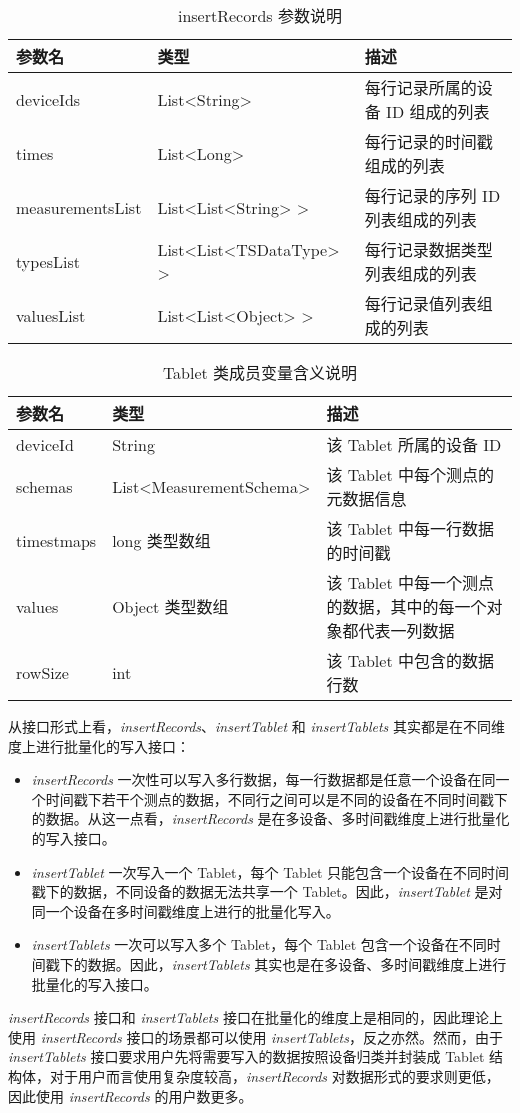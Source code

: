 \begin{table}
  \centering
  \caption{insertRecords 参数说明}
  \begin{tabular}{lll}
    \toprule
    参数名 &  类型 & 描述 \\
    \midrule
    deviceIds & List<String> & 每行记录所属的设备 ID 组成的列表 \\
     times & List<Long> & 每行记录的时间戳组成的列表 \\
    measurementsList & List<List<String> > & 每行记录的序列 ID 列表组成的列表 \\
    typesList & List<List<TSDataType> > & 每行记录数据类型列表组成的列表 \\
    valuesList & List<List<Object> > & 每行记录值列表组成的列表 \\
    \bottomrule
  \end{tabular}
  \label{tabular:insert-records-params}
\end{table}

\begin{table}
  \centering
  \caption{Tablet 类成员变量含义说明}
  \begin{tabular}{llp{6cm}}
    \toprule
    参数名 &  类型 & 描述 \\
    \midrule
    deviceId & String & 该 Tablet 所属的设备 ID \\
    schemas & List<MeasurementSchema> & 该 Tablet 中每个测点的元数据信息 \\
    timestmaps & long 类型数组 & 该 Tablet 中每一行数据的时间戳 \\
    values & Object 类型数组 & 该 Tablet 中每一个测点的数据，其中的每一个对象都代表一列数据 \\
    rowSize & int & 该 Tablet 中包含的数据行数\\
    \bottomrule
  \end{tabular}
  \label{tabular:class-tablet-param}
\end{table}

从接口形式上看，\emph{insertRecords}、\emph{insertTablet} 和 \emph{insertTablets} 其实都是在不同维度上进行批量化的写入接口：
\begin{itemize}
  \item \emph{insertRecords} 一次性可以写入多行数据，每一行数据都是任意一个设备在同一个时间戳下若干个测点的数据，不同行之间可以是不同的设备在不同时间戳下的数据。从这一点看，\emph{insertRecords} 是在多设备、多时间戳维度上进行批量化的写入接口。
  \item \emph{insertTablet} 一次写入一个 Tablet，每个 Tablet 只能包含一个设备在不同时间戳下的数据，不同设备的数据无法共享一个 Tablet。因此，\emph{insertTablet} 是对同一个设备在多时间戳维度上进行的批量化写入。
  \item \emph{insertTablets} 一次可以写入多个 Tablet，每个 Tablet 包含一个设备在不同时间戳下的数据。因此，\emph{insertTablets} 其实也是在多设备、多时间戳维度上进行批量化的写入接口。
\end{itemize}
\emph{insertRecords} 接口和 \emph{insertTablets} 接口在批量化的维度上是相同的，因此理论上使用 \emph{insertRecords} 接口的场景都可以使用 \emph{insertTablets}，反之亦然。然而，由于 \emph{insertTablets} 接口要求用户先将需要写入的数据按照设备归类并封装成 Tablet 结构体，对于用户而言使用复杂度较高，\emph{insertRecords} 对数据形式的要求则更低，因此使用 \emph{insertRecords} 的用户数更多。

